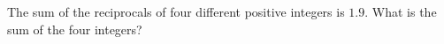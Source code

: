 The sum of the reciprocals of four different positive integers is $1.9$. What is the sum of the four integers?
